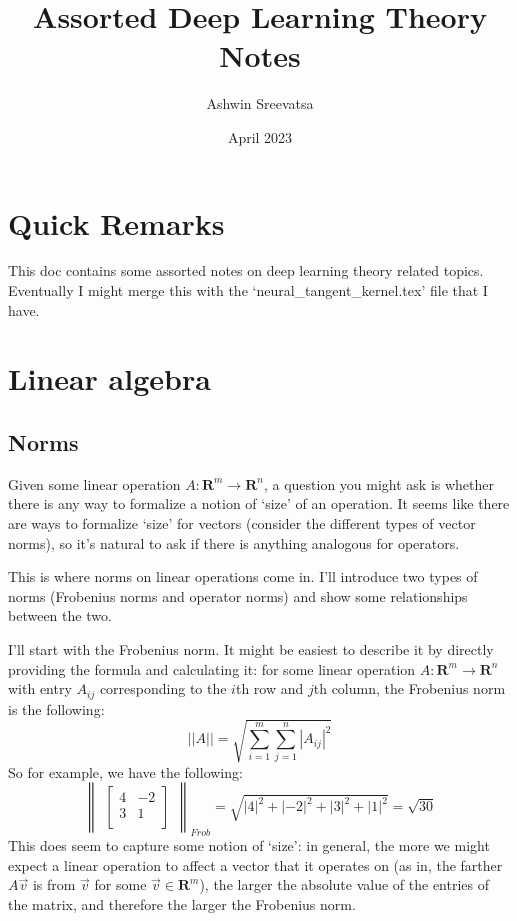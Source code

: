 \documentclass[answers,12pt]{exam}
\title{Assorted Deep Learning Theory Notes}
\author{Ashwin Sreevatsa}
\date{April 2023}
\begin{document}
\maketitle

\section*{Quick Remarks}
This doc contains some assorted notes on deep learning theory related topics.
Eventually I might merge this with the `neural\_tangent\_kernel.tex' file that I have.

\section{Linear algebra}
\subsection{Norms}
Given some linear operation $A: \mathbf{R}^m \to \mathbf{R}^n$, a question you might ask is whether there is any way to formalize a notion of `size' of an operation.
It seems like there are ways to formalize `size' for vectors (consider the different types of vector norms), so it's natural to ask if there is anything analogous for operators.

This is where norms on linear operations come in.
I'll introduce two types of norms (Frobenius norms and operator norms) and show some relationships between the two.

I'll start with the Frobenius norm.
It might be easiest to describe it by directly providing the formula and calculating it:
for some linear operation $A: \mathbf{R}^m \to \mathbf{R}^n$ with entry $A_{ij}$ corresponding to the $i$th row and $j$th column, the Frobenius norm is the following:
\[
    ||A|| = \sqrt{\sum_{i=1}^{m}\sum_{j=1}^{n} |A_{ij}|^2 }    
\]
So for example, we have the following:
\[
    \begin{Vmatrix}\begin{bmatrix} 4 & -2 \\ 3 & 1 \\ \end{bmatrix} \end{Vmatrix}_{Frob}
    = \sqrt{|4|^2 + |-2|^2 + |3|^2 + |1|^2}
    = \sqrt{30}
\]
This does seem to capture some notion of `size': 
in general, the more we might expect a linear operation to affect a vector that it operates on (as in, the farther $A \vec{v}$ is from $\vec{v}$ for some $\vec{v} \in \mathbf{R}^m$), the larger the absolute value of the entries of the matrix, and therefore the larger the Frobenius norm.
\end{document}
